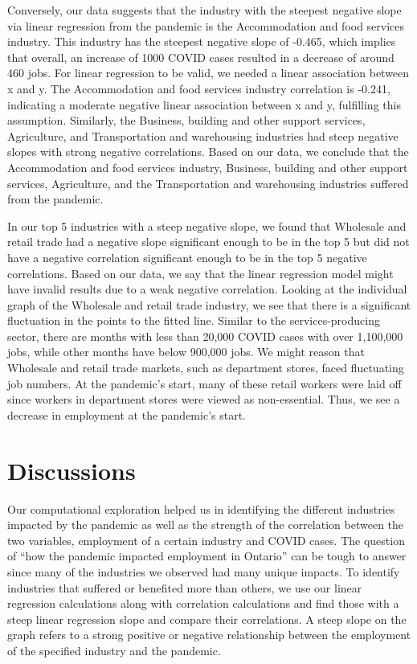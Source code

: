 \documentclass[fontsize=11pt]{article}
\begin{document}
Conversely, our data suggests that the industry with the steepest negative slope via linear regression from the pandemic is the Accommodation and food services industry. This industry has the steepest negative slope of -0.465, which implies that overall, an increase of 1000 COVID cases resulted in a decrease of around 460 jobs.  For linear regression to be valid, we needed a linear association between x and y. The Accommodation and food services industry correlation is -0.241, indicating a moderate negative linear association between x and y, fulfilling this assumption. Similarly, the Business, building and other support services,  Agriculture, and Transportation and warehousing industries had steep negative slopes with strong negative correlations. Based on our data, we conclude that the Accommodation and food services industry, Business, building and other support services,  Agriculture, and the Transportation and warehousing industries suffered from the pandemic. \newline


In our top 5 industries with a steep negative slope, we found that Wholesale and retail trade had a negative slope significant enough to be in the top 5 but did not have a negative correlation significant enough to be in the top 5 negative correlations. Based on our data, we say that the linear regression model might have invalid results due to a weak negative correlation. Looking at the individual graph of the Wholesale and retail trade industry, we see that there is a significant fluctuation in the points to the fitted line. Similar to the services-producing sector, there are months with less than 20,000 COVID cases with over 1,100,000 jobs, while other months have below 900,000 jobs. We might reason that Wholesale and retail trade markets, such as department stores, faced fluctuating job numbers. At the pandemic's start, many of these retail workers were laid off since workers in department stores were viewed as non-essential. Thus, we see a decrease in employment at the pandemic's start.

\newpage

\section{Discussions}

Our computational exploration helped us in identifying the different industries impacted by the pandemic as well as the strength of the correlation between the two variables, employment of a certain industry and COVID cases. The question of ``how the pandemic impacted employment in Ontario'' can be tough to answer since many of the industries we observed had many unique impacts. To identify industries that suffered or benefited more than others, we use our linear regression calculations along with correlation calculations and find those with a steep linear regression slope and compare their correlations. A steep slope on the graph refers to a strong positive or negative relationship between the employment of the specified industry and the pandemic.
\end{document}
